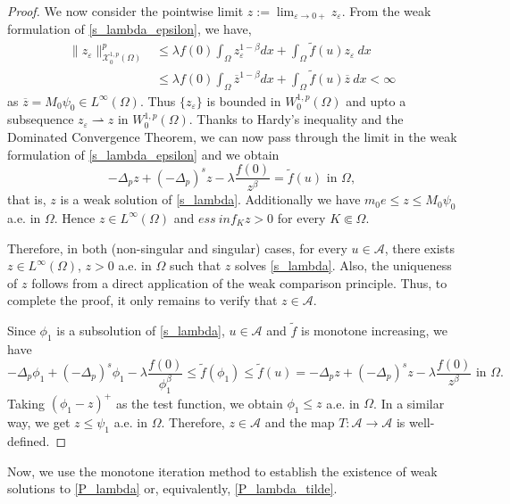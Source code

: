 \documentclass[reqno,oneside]{amsart}
\theoremstyle{definition}
\theoremstyle{remark}
\numberwithin{equation}{section}
\newcommand{\p}{\Delta_p}
\newcommand{\ps}{(-\Delta_p)^s}
\newcommand{\la} {\lambda}
\newcommand{\ba}{\beta}
\newcommand{\Om} {\Omega}
\newcommand{\rar}{\rightarrow}
\newcommand{\wop}{W^{1,p}_0 (\Omega)}
\newcommand{\ftil}{\tilde{f}}
\begin{document}
\begin{proof}
    We now consider the pointwise limit $z := \lim_{\varepsilon\rar 0+} z_{\varepsilon}$. From the weak formulation of \eqref{s_lambda_epsilon}, we have,
    \begin{align*}
        \|z_{\varepsilon}\|^p_{\mathcal{X}^{1,p}_0(\Om)} &\leq \la f(0) \int_{\Om} z_{\varepsilon}^{1-\ba} dx + \int_{\Om} \ftil (u) z_{\varepsilon}\ dx\\
        &\leq \la f(0) \int_{\Om} \overline{z}^{1-\ba} dx + \int_{\Om} \ftil (u) \overline{z}\ dx < \infty
    \end{align*}
    as $\overline{z} = M_0 \psi_0 \in L^{\infty}(\Om)$. Thus $\{z_{\varepsilon} \}$ is bounded in $\wop$ and upto a subsequence $z_{\varepsilon} \rightharpoonup z$ in $\wop$. Thanks to Hardy's inequality and the Dominated Convergence Theorem, we can now pass through the limit in the weak formulation of \eqref{s_lambda_epsilon} and we obtain
    \begin{equation*}
        -\p z + \ps z -\la \frac{f(0)}{z^{\ba}} = \tilde{f}(u) \text{ in } \Om,
    \end{equation*}
    that is, $z$ is a weak solution of \eqref{s_lambda}. Additionally we have $m_0 e \leq z \leq M_0 \psi_0$ a.e. in $\Om$. Hence $z \in L^{\infty}(\Om)$ and $ess\ inf_K z >0$ for every $K\Subset\Om$.

    Therefore, in both (non-singular and singular) cases, for every $u\in\mathcal{A}$, there exists $z\in L^{\infty}(\Om)$, $z>0$ a.e. in $\Om$ such that $z$ solves \eqref{s_lambda}. Also, the uniqueness of $z$ follows from a direct application of the weak comparison principle. Thus, to complete the proof, it only remains to verify that $z\in\mathcal{A}$.

    Since $\phi_1$ is a subsolution of \eqref{s_lambda}, $u\in\mathcal{A}$ and $\ftil$ is monotone increasing, we have
    \begin{equation*}
        -\p \phi_1 + \ps \phi_1 -\la \frac{f(0)}{\phi_1^{\ba}} \leq \tilde{f}(\phi_1) \leq \tilde{f}(u) = -\p z + \ps z -\la \frac{f(0)}{z^{\ba}} \text{ in } \Om.
    \end{equation*}
    Taking $(\phi_1 - z)^+$ as the test function,  we obtain $\phi_1 \leq z$ a.e. in $\Om$. In a similar way, we get $z \leq \psi_1$ a.e. in $\Om$. Therefore, $z\in \mathcal{A}$ and the map $T:\mathcal{A}\rar\mathcal{A}$ is well-defined.
\end{proof}

Now, we use the monotone iteration method to establish the existence of weak solutions to \eqref{P_lambda} or, equivalently, \eqref{P_lambda_tilde}.
\end{document}
